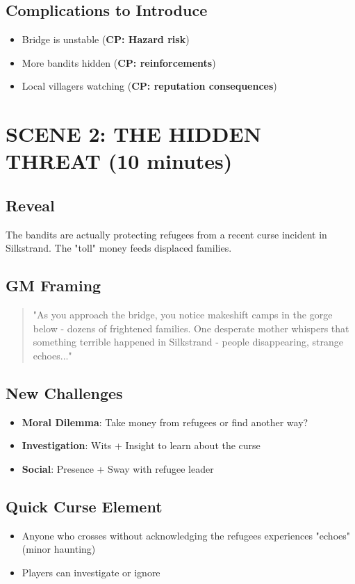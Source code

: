 \documentclass[12pt]{article}
\newcommand{\cp}[1]{\textbf{CP: #1}}
\begin{document}
\subsection*{Complications to Introduce}
\begin{itemize}
\item Bridge is unstable (\cp{Hazard risk})
\item More bandits hidden (\cp{reinforcements})
\item Local villagers watching (\cp{reputation consequences})
\end{itemize}

\section{SCENE 2: THE HIDDEN THREAT (10 minutes)}

\subsection*{Reveal}
The bandits are actually protecting refugees from a recent curse incident in Silkstrand. The "toll" money feeds displaced families.

\subsection*{GM Framing}
\begin{quote}
"As you approach the bridge, you notice makeshift camps in the gorge below - dozens of frightened families. One desperate mother whispers that something terrible happened in Silkstrand - people disappearing, strange echoes..."
\end{quote}

\subsection*{New Challenges}
\begin{itemize}
\item \textbf{Moral Dilemma}: Take money from refugees or find another way?
\item \textbf{Investigation}: Wits + Insight to learn about the curse
\item \textbf{Social}: Presence + Sway with refugee leader
\end{itemize}

\subsection*{Quick Curse Element}
\begin{itemize}
\item Anyone who crosses without acknowledging the refugees experiences "echoes" (minor haunting)
\item Players can investigate or ignore
\end{itemize}
\end{document}
